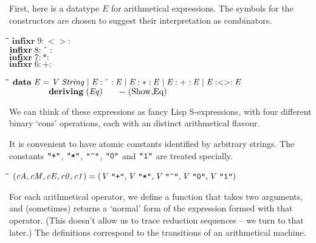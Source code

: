 \documentclass{article}
\newlength{\lwidth}\setlength{\lwidth}{4.5cm}
\newlength{\cwidth}\setlength{\cwidth}{8mm} %
\newcommand{\Conid}[1]{\mathit{#1}}
\newcommand{\Varid}[1]{\mathit{#1}}
\begin{document}
First, here is a datatype \ensuremath{\Conid{E}} for arithmetical expressions.  The symbols 
for the constructors are chosen to suggest their interpretation as
combinators.

\begin{tabbing}
\qquad\=\hspace{\lwidth}\=\hspace{\cwidth}\=\+\kill
${\mathbf{infixr}\;\mathrm{9}\mathbin{:<>:}}$\\
${\mathbf{infixr}\;\mathrm{8}\mathbin{:\char94 :}}$\\
${\mathbf{infixr}\;\mathrm{7}\mathbin{:*:}}$\\
${\mathbf{infixr}\;\mathrm{6}\mathbin{:+:}}$
\end{tabbing}
\begin{tabbing}
\qquad\=\hspace{\lwidth}\=\hspace{\cwidth}\=\+\kill
${\mathbf{data}\;\Conid{E}\mathrel{=}\Conid{V}\;\Conid{String}\mid \Conid{E}\mathbin{:\char94 :}\Conid{E}\mid \Conid{E}\mathbin{:*:}\Conid{E}\mid \Conid{E}\mathbin{:+:}\Conid{E}\mid \Conid{E}\mathbin{:<>:}\Conid{E}}$\\
${\phantom{\mathbf{data}\;\Conid{E}\mathrel{=}\mbox{}}\mathbf{deriving}\;(\Conid{Eq})\mbox{\qquad-{}-  (Show,Eq) }}$
\end{tabbing}
We can think of these expressions as fancy Lisp S-expressions, with four
different binary `cons' operations, each with an distinct arithmetical flavour.


It is convenient to have atomic constants identified by arbitrary strings.
The constants \ensuremath{\text{\ttfamily \char34 +\char34}}, \ensuremath{\text{\ttfamily \char34 *\char34}}, \ensuremath{\text{\ttfamily \char34 \char94 \char34}}, \ensuremath{\text{\ttfamily \char34 0\char34}} and \ensuremath{\text{\ttfamily \char34 1\char34}} are treated specially.
\begin{tabbing}
\qquad\=\hspace{\lwidth}\=\hspace{\cwidth}\=\+\kill
${(\Varid{cA},\Varid{cM},\Varid{cE},\Varid{c0},\Varid{c1})\mathrel{=}(\Conid{V}\;\text{\ttfamily \char34 +\char34},\Conid{V}\;\text{\ttfamily \char34 *\char34},\Conid{V}\;\text{\ttfamily \char34 \char94 \char34},\Conid{V}\;\text{\ttfamily \char34 0\char34},\Conid{V}\;\text{\ttfamily \char34 1\char34})}$
\end{tabbing}
For each arithmetical operator, we define a function that takes two
arguments, and (sometimes) returns a `normal' form of the expression 
formed with that operator.  (This doesn't allow us to trace reduction
sequences -- we turn to that later.) The definitions correspond to the
transitions of an arithmetical machine. 
\end{document}
